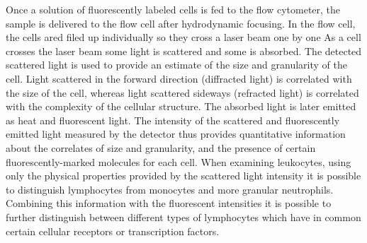 Once a solution of fluorescently labeled cells is fed to the flow cytometer,
the sample is delivered to the flow cell after hydrodynamic focusing.
In the flow cell, the cells ared filed up individually so they cross a laser beam one by one \citep{Shapiro:2003vq}
As a cell crosses the laser beam some light is scattered and some is absorbed. The detected scattered light is used to provide an estimate of the size and granularity of the cell.
Light scattered in the forward direction (diffracted light) is correlated with the size of the cell, whereas light scattered sideways (refracted light) is correlated with the complexity of the cellular structure.
The absorbed light is later emitted as heat and fluorescent light.
The intensity of the scattered and fluorescently emitted light measured by the detector thus provides quantitative information about the correlates of size and granularity, and the presence of certain fluorescently-marked molecules for each cell.
When examining leukocytes, using only the physical properties provided by the scattered light intensity it is possible to distinguish lymphocytes from monocytes and more granular neutrophils.
Combining this information with the fluorescent intensities it is possible to further distinguish between different types of lymphocytes which have in common certain cellular receptors or transcription factors.

